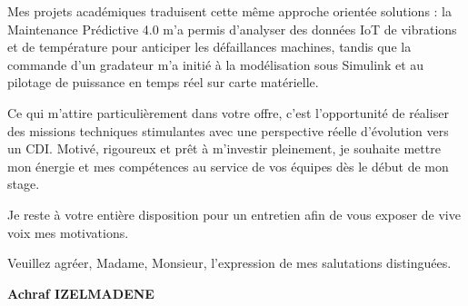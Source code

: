 \documentclass[11pt,a4paper]{article}
\begin{document}
Mes projets académiques traduisent cette même approche orientée solutions : la Maintenance Prédictive 4.0 m'a permis d'analyser des données IoT de vibrations et de température pour anticiper les défaillances machines, tandis que la commande d'un gradateur m'a initié à la modélisation sous Simulink et au pilotage de puissance en temps réel sur carte matérielle.

Ce qui m'attire particulièrement dans votre offre, c'est l'opportunité de réaliser des missions techniques stimulantes avec une perspective réelle d'évolution vers un CDI. Motivé, rigoureux et prêt à m'investir pleinement, je souhaite mettre mon énergie et mes compétences au service de vos équipes dès le début de mon stage.

Je reste à votre entière disposition pour un entretien afin de vous exposer de vive voix mes motivations.

Veuillez agréer, Madame, Monsieur, l'expression de mes salutations distinguées.

\vspace{1cm}
\textbf{Achraf IZELMADENE}
\end{document}
